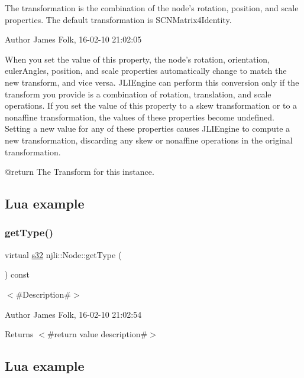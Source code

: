 The transformation is the combination of the node’s rotation, position, and scale properties. The default transformation is S\+C\+N\+Matrix4\+Identity. 

\begin{DoxyAuthor}{Author}
James Folk, 16-\/02-\/10 21\+:02\+:05
\end{DoxyAuthor}
When you set the value of this property, the node’s rotation, orientation, euler\+Angles, position, and scale properties automatically change to match the new transform, and vice versa. J\+L\+I\+Engine can perform this conversion only if the transform you provide is a combination of rotation, translation, and scale operations. If you set the value of this property to a skew transformation or to a nonaffine transformation, the values of these properties become undefined. Setting a new value for any of these properties causes J\+L\+I\+Engine to compute a new transformation, discarding any skew or nonaffine operations in the original transformation. \begin{DoxyVerb} @return The Transform for this instance.
\end{DoxyVerb}
\hypertarget{classnjli_1_1_steering_behavior_wander_ex1}{}\subsection{Lua example}\label{classnjli_1_1_steering_behavior_wander_ex1}

\begin{DoxyCodeInclude}
\end{DoxyCodeInclude}
\mbox{\label{classnjli_1_1_node_a8c949ac7cdab8b3251e51162f9a7127d}} 
\subsubsection{\texorpdfstring{get\+Type()}{getType()}}
{\footnotesize\ttfamily virtual \mbox{\hyperlink{_util_8h_aa62c75d314a0d1f37f79c4b73b2292e2}{s32}} njli\+::\+Node\+::get\+Type (\begin{DoxyParamCaption}{ }\end{DoxyParamCaption}) const\hspace{0.3cm}{\ttfamily [virtual]}}



$<$\#\+Description\#$>$ 

\begin{DoxyAuthor}{Author}
James Folk, 16-\/02-\/10 21\+:02\+:54
\end{DoxyAuthor}
\begin{DoxyReturn}{Returns}
$<$\#return value description\#$>$
\end{DoxyReturn}
\hypertarget{classnjli_1_1_steering_behavior_wander_ex1}{}\subsection{Lua example}\label{classnjli_1_1_steering_behavior_wander_ex1}

